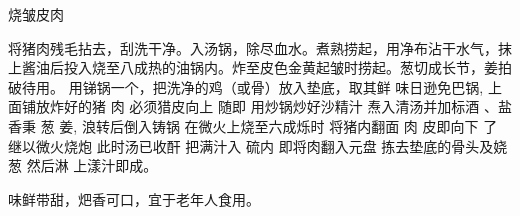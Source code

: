 \begin{recipe}{烧皱皮肉}

\ingredients


\cooking

\step 将猪肉残毛拈去，刮洗干净。入汤锅，除尽血水。煮熟捞起，用净布沾干水气，抹上酱油后投入烧至八成热的油锅内。炸至皮色金黄起皱时捞起。葱切成长节，姜拍破待用。 
\step 用锑锅一个，把洗净的鸡（或骨）放入垫底，取其鲜 味日逊免巴锅, 上面铺放炸好的猪 肉 必须猎皮向上 随即 用炒锅炒好沙精汁 焘入清汤并加标酒 、盐 香秉 葱 姜, 浪转后倒入铸锅 在微火上烧至六成烁时 将猪内翻面 肉 皮即向下 了 继以微火烧炮 此时汤已收酐 把满汁入 硫内 即将肉翻入元盘 拣去垫底的骨头及娆 葱 然后淋 上漾汁即成。

\notes

味鲜带甜，𤆵香可口，宜于老年人食用。 

\end{recipe}

